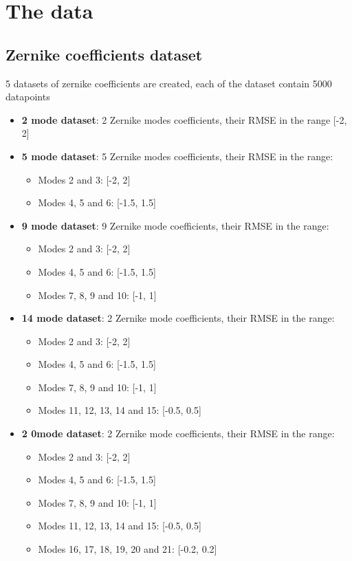 \section{The data}
	
	\subsection{Zernike coefficients dataset}
			5 datasets of zernike coefficients are created, each of the dataset contain 5000 datapoints
			\begin{itemize}
				\item \textbf{2 mode dataset}: 2 Zernike modes coefficients, their RMSE in the range [-2, 2]
				\item \textbf{5 mode dataset}: 5 Zernike modes coefficients, their RMSE in the range:
					\begin{itemize}
						\item Modes 2 and 3: [-2, 2]
						\item Modes 4, 5 and 6: [-1.5, 1.5]
					\end{itemize}					 
				\item \textbf{9 mode dataset}: 9 Zernike mode coefficients, their RMSE in the range:
					\begin{itemize}
						\item Modes 2 and 3: [-2, 2]
						\item Modes 4, 5 and 6: [-1.5, 1.5]
						\item Modes 7, 8, 9 and 10: [-1, 1]
					\end{itemize}					 
				\item \textbf{14 mode dataset}: 2 Zernike mode coefficients, their RMSE in the range:
					\begin{itemize}
						\item Modes 2 and 3: [-2, 2]
						\item Modes 4, 5 and 6: [-1.5, 1.5]
						\item Modes 7, 8, 9 and 10: [-1, 1]
						\item Modes 11, 12, 13, 14 and 15: [-0.5, 0.5]
					\end{itemize}					 
				\item \textbf{2 0mode dataset}: 2 Zernike mode coefficients, their RMSE in the range:
					\begin{itemize}
						\item Modes 2 and 3: [-2, 2]
						\item Modes 4, 5 and 6: [-1.5, 1.5]
						\item Modes 7, 8, 9 and 10: [-1, 1]
						\item Modes 11, 12, 13, 14 and 15: [-0.5, 0.5]
						\item Modes 16, 17, 18, 19, 20 and 21: [-0.2, 0.2]
					\end{itemize}					 
			\end{itemize}
			
